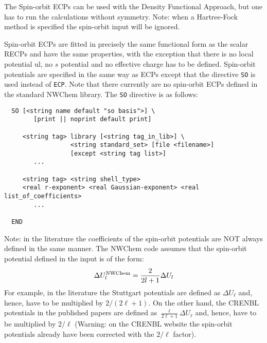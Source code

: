 The Spin-orbit ECPs can be used with the Density Functional Approach, but 
one has to run the calculations without symmetry. Note: when a Hartree-Fock
method is specified the spin-orbit input will be ignored.

Spin-orbit ECPs are fitted in precisely the same functional form as the
scalar RECPs and have the same properties, with the exception that there is
no local potential ul, no $s$ potential and no effective charge has to be
defined. Spin-orbit potentials are
specified in the same way as ECPs except that the directive \verb+SO+ is
used instead of \verb+ECP+. Note that there currently are no spin-orbit
ECPs defined in the standard NWChem library.  The \verb+SO+ 
directive is as follows:

\begin{verbatim}
  SO [<string name default "so basis">] \
        [print || noprint default print]

     <string tag> library [<string tag_in_lib>] \
                  <string standard_set> [file <filename>]
                  [except <string tag list>]
        ...

     <string tag> <string shell_type>
     <real r-exponent> <real Gaussian-exponent> <real list_of_coefficients>
        ...
     
  END
\end{verbatim}    

Note: in the literature the coefficients of the spin-orbit potentials are NOT 
always defined in the same manner. The NWChem code assumes that the spin-orbit
potential defined in the input is of the form:
\begin{equation}
\Delta U^{\rm NWChem}_{\ell} = \frac{2}{2\ell+1} \Delta U_{\ell} 
\end{equation}
For example, in the literature the Stuttgart potentials are defined as 
$\Delta U_{\ell}$ and, hence, have to be multiplied by $2/(2{\ell}+1)$. On the 
other hand, the CRENBL potentials in the published papers are defined as 
$\frac{\ell}{2\ell+1} \Delta U_{\ell}$ and, hence, have to be multiplied by 
$2/{\ell}$ (Warning: on the CRENBL website the spin-orbit potentials already
have been corrected with the $2/{\ell}$ factor).


